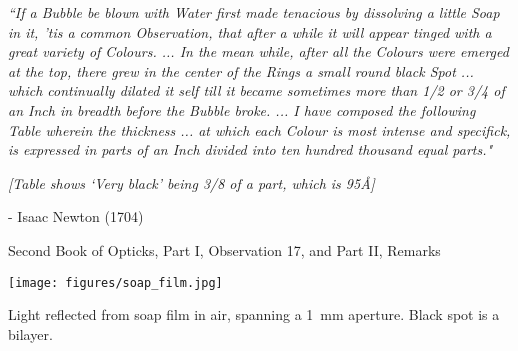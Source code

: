 \newpage

\noindent
\textit{``If a Bubble be blown with Water first made tenacious by dissolving a little Soap in it, 'tis a common Observation, that after a while it will appear tinged with a great variety of Colours. ... In the mean while, after all the Colours were emerged at the top, there grew in the center of the Rings a small round black Spot ... which continually dilated it self till it became sometimes more than 1/2 or 3/4 of an Inch in breadth before the Bubble broke. ... I have composed the following Table wherein the thickness ... at which each Colour is most intense and specifick, is expressed in parts of an Inch divided into ten hundred thousand equal parts."}

\noindent
\textit{[Table shows `Very black' being 3/8 of a part, which is \num{95}\AA]}

- Isaac Newton (1704)

  Second Book of Opticks, Part I, Observation 17, and Part II, Remarks

\begin{center}
\texttt{[image: figures/soap\_film.jpg]}

\noindent
Light reflected from soap film in air, spanning a \SI{1}{\mm} aperture.  Black spot is a bilayer.
\end{center}